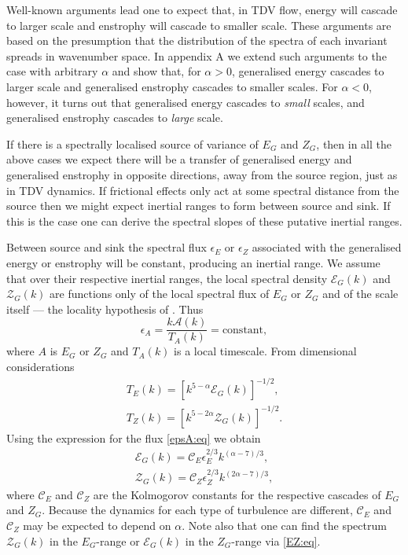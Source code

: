 \documentclass{jfm}
\newcommand{\ca}  [1]{\mathcal{#1}}
\begin{document}
Well-known arguments \citep{Batchelor53} lead one to expect that,
in TDV flow, energy will cascade to larger scale and enstrophy
will cascade to smaller scale. These arguments are based on the
presumption that the distribution of the spectra of each
invariant spreads in wavenumber space.  In appendix A we extend
such arguments to the case with arbitrary $\alpha$ and show that,
for $\alpha>0$, generalised energy cascades to larger scale and
generalised enstrophy cascades to smaller scales.  For
$\alpha<0$, however, it turns out that generalised energy
cascades to \textit{small} scales, and generalised enstrophy
cascades to \textit{large} scale.

If there is a spectrally localised source of variance of $E_G$ and
$Z_G$, then in all the above cases we expect there will be a
transfer of generalised energy and generalised enstrophy in
opposite directions, away from the source region, just as in TDV
dynamics. If frictional effects only act at some spectral
distance from the source then we might expect inertial ranges to
form between source and sink.  If this is the case one can derive
the spectral slopes of these putative inertial ranges.

Between source and sink the spectral flux $\epsilon_E$ or $\epsilon_Z$
associated with the generalised energy or enstrophy will be constant,
producing an inertial range.  We assume that over their respective
inertial ranges, the local spectral density $\ca{E}_G(k)$ and
$\ca{Z}_G(k)$ are functions only of the local spectral flux of $E_G$
or $Z_G$ and of the scale itself --- the locality hypothesis of
\citet{Kolmogorov41}. Thus
\begin{equation}
\epsilon_A = \frac{k\ca{A}(k)}{T_A(k)} = \textrm{constant},
\label{epsA:eq}
\end{equation}
where $A$ is $E_G$ or $Z_G$ and $T_A(k)$ is a local timescale.  From
dimensional considerations
\begin{subequations}
\begin{align}
T_E(k) = [k^{5-\alpha}\ca{E}_G(k)]^{-1/2}, \label{TE:eq} \\
T_Z(k) = [k^{5-2\alpha}\ca{Z}_G(k)]^{-1/2}. \label{TZ:eq}
\end{align}
\end{subequations}
Using the expression for the flux \eqref{epsA:eq} we obtain
\begin{subequations}
\begin{align}
\ca{E}_G(k) = \ca{C}_E\epsilon_E^{2/3}k^{(\alpha-7)/3},
\label{Espec:eq} \\
\ca{Z}_G(k) = \ca{C}_Z\epsilon_Z^{2/3}k^{(2\alpha-7)/3},
\label{Zspec:eq}
\end{align}
\end{subequations}
where $\ca{C}_E$ and $\ca{C}_Z$ are the Kolmogorov constants for the
respective cascades of $E_G$ and $Z_G$.  Because the dynamics for each
type of turbulence are different, $\ca{C}_E$ and $\ca{C}_Z$ may be
expected to depend on $\alpha$.  Note also that one can find the
spectrum $\ca{Z}_G(k)$ in the $E_G$-range or $\ca{E}_G(k)$ in the
$Z_G$-range via \eqref{EZ:eq}.
\end{document}
